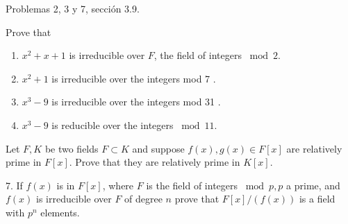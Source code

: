 




Problemas 2, 3 y 7, sección 3.9.

\begin{problema}[Problema 2]
    Prove that
    \begin{enumerate}
        \item $x^2+x+1$ is irreducible over $F$, the field of integers $\bmod 2$.
        \item $x^2+1$ is irreducible over the integers mod 7 .
        \item $x^3-9$ is irreducible over the integers mod 31 .
        \item $x^3-9$ is reducible over the integers $\bmod 11$.
    \end{enumerate}


    \begin{dem}
    \end{dem}
\end{problema}
\begin{problema}[Problema 3]
    Let $F, K$ be two fields $F \subset K$ and suppose $f(x), g(x) \in F[x]$ are relatively prime in $F[x]$. Prove that they are relatively prime in $K[x]$.
    \begin{dem}
    \end{dem}
\end{problema}
\begin{problema}[Problema 7]
    7. If $f(x)$ is in $F[x]$, where $F$ is the field of integers $\bmod p, p$ a prime, and $f(x)$ is irreducible over $F$ of degree $n$ prove that $F[x] /(f(x))$ is a field with $p^n$ elements.
    \begin{dem}
    \end{dem}
\end{problema}

%
%

